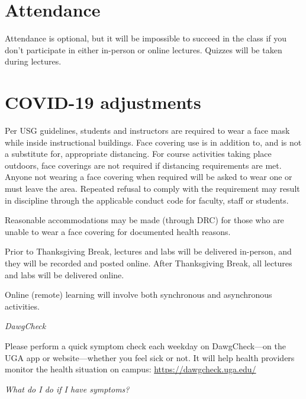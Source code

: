 \documentclass[12pt]{article}
\begin{document}
\section*{\normalsize Attendance}
\vspace{-4mm}
Attendance is optional, but it will be impossible to succeed in the
class if you don't participate in either in-person or online
lectures. Quizzes will be taken during lectures.  

\vspace{-2mm}
\section*{\normalsize COVID-19 adjustments}
\vspace{-4mm}
Per USG guidelines, students and instructors are required to wear a
face mask while inside instructional buildings. Face covering use is
in addition to, and is not a substitute for, appropriate
distancing. For course activities taking place outdoors, face
coverings are not required if distancing requirements are met. Anyone
not wearing a face covering when required will be asked to wear one or
must leave the area. Repeated refusal to comply with the requirement
may result in discipline through the applicable conduct code for
faculty, staff or students.

Reasonable accommodations may be made (through DRC) for those who are
unable to wear a face covering for documented health reasons. 

Prior to Thanksgiving Break, lectures and labs will be delivered
in-person, and they will be recorded and posted online. After
Thanksgiving Break, all lectures and labs will be delivered online. 

Online (remote) learning will involve both synchronous and
asynchronous activities.



{\it DawgCheck}

Please perform a quick symptom check each weekday on DawgCheck—on the
UGA app or website—whether you feel sick or not. It will help health
providers monitor the health situation on campus:
\url{https://dawgcheck.uga.edu/}

{\it What do I do if I have symptoms?}
\end{document}
